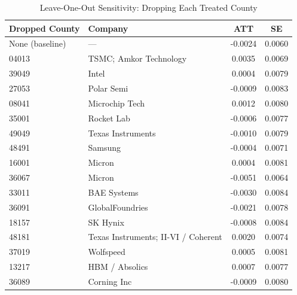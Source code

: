 \begin{table}[htbp]
\centering
\caption{Leave-One-Out Sensitivity: Dropping Each Treated County}
\label{tab:loo}
\begin{tabular}{ll cc}
\toprule
Dropped County & Company & ATT & SE \\
\midrule
None (baseline) & --- & -0.0024 & 0.0060 \\
\midrule
04013 & TSMC; Amkor Technology & 0.0035 & 0.0069 \\
39049 & Intel & 0.0004 & 0.0079 \\
27053 & Polar Semi & -0.0009 & 0.0083 \\
08041 & Microchip Tech & 0.0012 & 0.0080 \\
35001 & Rocket Lab & -0.0006 & 0.0077 \\
49049 & Texas Instruments & -0.0010 & 0.0079 \\
48491 & Samsung & -0.0004 & 0.0071 \\
16001 & Micron & 0.0004 & 0.0081 \\
36067 & Micron & -0.0051 & 0.0064 \\
33011 & BAE Systems & -0.0030 & 0.0084 \\
36091 & GlobalFoundries & -0.0021 & 0.0078 \\
18157 & SK Hynix & -0.0008 & 0.0084 \\
48181 & Texas Instruments; II-VI / Coherent & 0.0020 & 0.0074 \\
37019 & Wolfspeed & 0.0005 & 0.0081 \\
13217 & HBM / Absolics & 0.0007 & 0.0077 \\
36089 & Corning Inc & -0.0009 & 0.0080 \\
\bottomrule
\end{tabular}
\par{}
\end{table}

